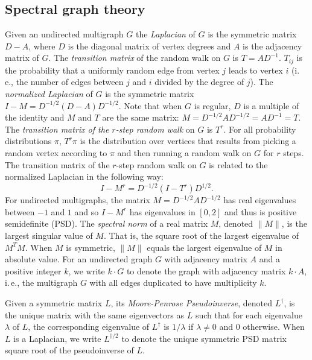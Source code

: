 \documentclass[11pt]{article}
\numberwithin{equation}{section}
\theoremstyle{definition}
\theoremstyle{plain}
\newcommand{\ie}{i.\,e.}
\numberwithin{myalgctr}{section}
\theoremstyle{named}
\begin{document}
\subsection{Spectral graph theory}   
Given an undirected multigraph $G$ the \emph{Laplacian} of $G$ is the symmetric matrix $D-A$, where $D$ is the diagonal matrix of vertex degrees and $A$ is the adjacency matrix of $G$. The \emph{transition matrix} of the random walk on $G$ is $T=AD^{-1}$. $T_{ij}$ is the probability that a uniformly random edge from vertex $j$ leads to vertex $i$ (\ie, the number of edges between $j$ and $i$ divided by the degree of $j$). The \emph{normalized Laplacian} of $G$ is the symmetric matrix $I-M=D^{-1/2}(D-A)D^{-1/2}$. Note that when $G$ is regular, $D$ is a multiple of the identity and $M$ and $T$ are the same matrix: $M=D^{-1/2}AD^{-1/2}=AD^{-1}=T$. The \emph{transition matrix of the $r$-step random walk} on $G$ is $T^r$. For all probability distributions $\pi$, $T^r\pi$ is the distribution over vertices that results from picking a random vertex according to $\pi$ and then running a random walk on $G$ for $r$ steps. The transition matrix of the $r$-step random walk on $G$ is related to the normalized Laplacian in the following way:
\[
I-M^r = D^{-1/2}(I-T^r)D^{1/2}.
\]
For undirected multigraphs, the matrix $M=D^{-1/2}AD^{-1/2}$ has real eigenvalues between $-1$ and $1$ and so $I-M^r$ has eigenvalues in $[0,2]$ and thus is positive semidefinite (PSD). The \emph{spectral norm} of a real matrix $M$, denoted $\|M\|$, is the largest singular value of $M$. That is, the square root of the largest eigenvalue of $M^TM$. When $M$ is symmetric, $\|M\|$ equals the largest eigenvalue of $M$ in absolute value. For an undirected graph $G$ with adjacency matrix $A$ and a positive
integer $k$, we write $k\cdot G$ to denote the graph with adjacency matrix $k\cdot A$, \ie, the multigraph $G$ with all edges duplicated to have multiplicity $k$. 

Given a symmetric matrix $L$, its \emph{Moore-Penrose Pseudoinverse}, denoted $L^{\dagger}$, is the unique matrix with the same eigenvectors as $L$ such that for each eigenvalue $\lambda$ of $L$, the corresponding eigenvalue of $L^{\dagger}$ is $1/\lambda$ if $\lambda\neq 0$ and 0 otherwise. When $L$ is a Laplacian, we write $L^{\dagger/2}$ to denote the unique symmetric PSD matrix square root of the pseudoinverse of $L$. 
\end{document}
